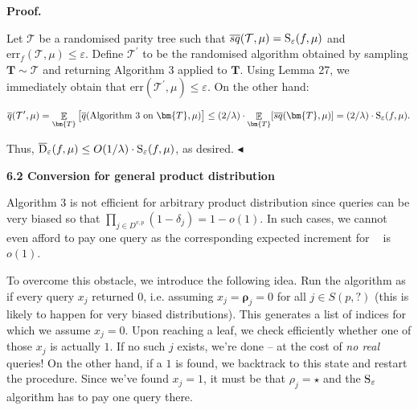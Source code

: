 \documentclass[10pt,a4paper]{article}
\begin{document}
\par\medskip\noindent\textbf{Proof.}\par




Let $\mathcal{T}$ be a randomised parity tree such that $\mathop{\overline{sq}}(\mathcal{T},\mu)={\textup{S}}_{\varepsilon}(f,\mu)$ and $\mathrm{err}_{f}(\mathcal{T},\mu)\leq\varepsilon$. Define $\mathcal{T}^{\prime}$ to be the randomised algorithm obtained by sampling $\bm{T}\sim\mathcal{T}$ and returning Algorithm 3 applied to $\bm{T}$. Using Lemma 27, we immediately obtain that $\mathrm{err}(\mathcal{T}^{\prime},\mu)\leq\varepsilon$. On the other hand:\par


\[\begin{gathered}
\overline{q}(\mathcal{T}^{\prime},\mu)=\mathop{\mathbb{E}}_{\bm{T}}\big{[}\overline{q}(\text{Algorithm 3 on $\bm{T}$},\mu)\big{]}\leq(2/\lambda)\cdot\mathop{\mathbb{E}}_{\bm{T}}[\mathop{\overline{sq}}(\bm{T},\mu)]=(2/\lambda)\cdot{\textup{S}}_{\varepsilon}(f,\mu).
\end{gathered}\]


Thus, $\overline{{\textup{D}}}_{\varepsilon}(f,\mu)\leq O(1/\lambda)\cdot{\textup{S}}_{\varepsilon}(f,\mu)$, as desired.
$\blacktriangleleft$\par







\par\medskip\noindent\textbf{
6.2 Conversion for general product distribution}\par




Algorithm 3 is not efficient for arbitrary product distribution since queries can be very biased so that $\prod_{j\in D^{v,p}}(1-\delta_{j})=1-o(1)$. In such cases, we cannot even afford to pay one query as the corresponding expected increment for $\mathop{\overline{sq}}$ is $o(1)$.\par




To overcome this obstacle, we introduce the following idea. Run the algorithm as if every query $x_{j}$ returned $0$, i.e. assuming $x_{j}=\bm{\rho}_{j}=0$ for all $j\in S(p,\mathord{?})$ (this is likely to happen for very biased distributions). This generates a list of indices for which we assume $x_{j}=0$. Upon reaching a leaf, we check efficiently whether one of those $x_{j}$ is actually $1$. If no such $j$ exists, we’re done – at the cost of \emph{no real} queries! On the other hand, if a $1$ is found, we backtrack to this state and restart the procedure. Since we’ve found $x_{j}=1$, it must be that $\rho_{j}=\star$ and the ${\textup{S}}_{\varepsilon}$ algorithm has to pay one query there.\par
\end{document}
